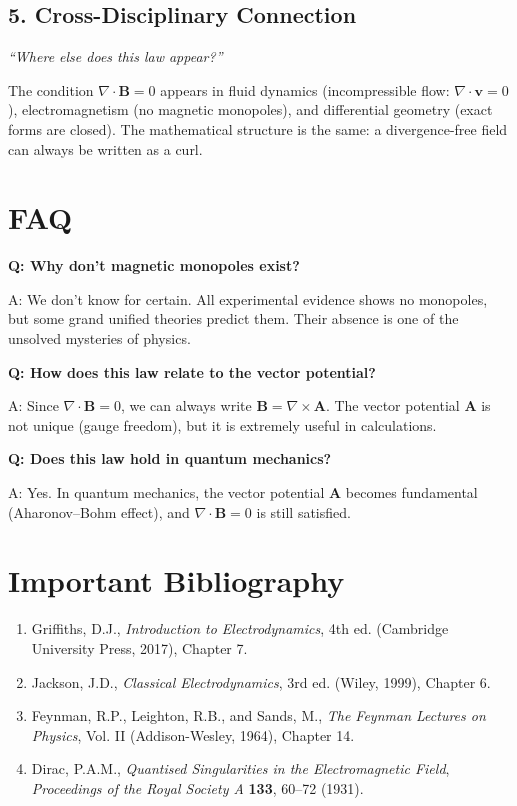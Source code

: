 \subsection*{5. Cross-Disciplinary Connection}
\textit{``Where else does this law appear?''}

The condition $\nabla \cdot \mathbf{B} = 0$ appears in fluid dynamics (incompressible flow: $\nabla \cdot \mathbf{v} = 0$), electromagnetism (no magnetic monopoles), and differential geometry (exact forms are closed). The mathematical structure is the same: a divergence-free field can always be written as a curl.

\section*{FAQ}

\textbf{Q: Why don't magnetic monopoles exist?}

A: We don't know for certain. All experimental evidence shows no monopoles, but some grand unified theories predict them. Their absence is one of the unsolved mysteries of physics.

\textbf{Q: How does this law relate to the vector potential?}

A: Since $\nabla \cdot \mathbf{B} = 0$, we can always write $\mathbf{B} = \nabla \times \mathbf{A}$. The vector potential $\mathbf{A}$ is not unique (gauge freedom), but it is extremely useful in calculations.

\textbf{Q: Does this law hold in quantum mechanics?}

A: Yes. In quantum mechanics, the vector potential $\mathbf{A}$ becomes fundamental (Aharonov--Bohm effect), and $\nabla \cdot \mathbf{B} = 0$ is still satisfied.

\section*{Important Bibliography}

\begin{enumerate}
\item Griffiths, D.J., \textit{Introduction to Electrodynamics}, 4th ed. (Cambridge University Press, 2017), Chapter 7.
\item Jackson, J.D., \textit{Classical Electrodynamics}, 3rd ed. (Wiley, 1999), Chapter 6.
\item Feynman, R.P., Leighton, R.B., and Sands, M., \textit{The Feynman Lectures on Physics}, Vol. II (Addison-Wesley, 1964), Chapter 14.
\item Dirac, P.A.M., \textit{Quantised Singularities in the Electromagnetic Field}, \textit{Proceedings of the Royal Society A} \textbf{133}, 60--72 (1931).
\end{enumerate}
